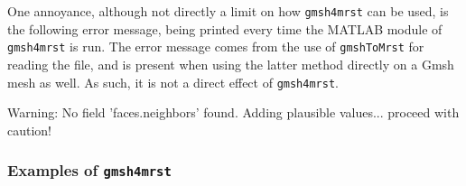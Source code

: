 One annoyance, although not directly a limit on how \verb|gmsh4mrst| can be used, is the following error message, being printed every time the MATLAB module of \verb|gmsh4mrst| is run. The error message comes from the use of \verb|gmshToMrst| for reading the file, and is present when using the latter method directly on a Gmsh mesh as well. As such, it is not a direct effect of \verb|gmsh4mrst|.
\begin{codeError}
Warning: No field 'faces.neighbors' found. Adding plausible values... proceed with caution! 
\end{codeError}

\subsubsection{Examples of \texttt{gmsh4mrst}}

